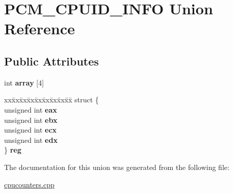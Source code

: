 \hypertarget{union_p_c_m___c_p_u_i_d___i_n_f_o}{}\section{P\+C\+M\+\_\+\+C\+P\+U\+I\+D\+\_\+\+I\+N\+FO Union Reference}
\label{union_p_c_m___c_p_u_i_d___i_n_f_o}
\subsection*{Public Attributes}
\begin{DoxyCompactItemize}
\item 
\mbox{\label{union_p_c_m___c_p_u_i_d___i_n_f_o_ad6b8b5c108abcb429d64f6c27f4febe0}} 
int {\bfseries array} \mbox{[}4\mbox{]}
\item 
\mbox{\label{union_p_c_m___c_p_u_i_d___i_n_f_o_a2f6fdd256c2243989c717f14155820c3}} 
\begin{tabbing}
xx\=xx\=xx\=xx\=xx\=xx\=xx\=xx\=xx\=\kill
struct \{\\
\>unsigned int {\bfseries eax}\\
\>unsigned int {\bfseries ebx}\\
\>unsigned int {\bfseries ecx}\\
\>unsigned int {\bfseries edx}\\
\} {\bfseries reg}\\

\end{tabbing}\end{DoxyCompactItemize}


The documentation for this union was generated from the following file\+:\begin{DoxyCompactItemize}
\item 
\mbox{\hyperlink{cpucounters_8cpp}{cpucounters.\+cpp}}\end{DoxyCompactItemize}
